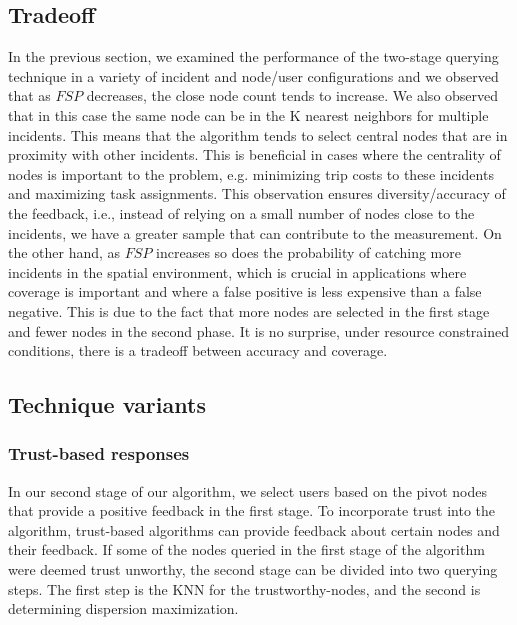 \documentclass{acm_proc_article-sp}
\begin{document}
\subsection{Tradeoff}
In the previous section, we examined the performance of the two-stage querying technique in a variety of incident and node/user configurations and we observed that as $FSP$ decreases, the close node count tends to increase. We also observed that in this case the same node can be in the K nearest neighbors for multiple incidents. This means that the algorithm tends to select central nodes that are in proximity with other incidents. This is beneficial in cases where the centrality of nodes is important to the problem, e.g. minimizing trip costs to these incidents and maximizing task assignments. This observation ensures diversity/accuracy of the feedback, i.e., instead of relying on a small number of nodes close to the incidents, we have a greater sample that can contribute to the measurement.
On the other hand, as $FSP$ increases so does the probability of catching more incidents in the spatial environment, which is crucial in applications where coverage is important and where a false positive is less expensive than a false negative. This is due to the fact that more nodes are selected in the first stage and fewer nodes in the second phase. It is no surprise, under resource constrained conditions, there is a tradeoff between accuracy and coverage.

\subsection{Technique variants}
\subsubsection{Trust-based responses}
In our second stage of our algorithm, we select users based on the pivot nodes that provide a positive feedback in the first stage. To incorporate trust into the algorithm, trust-based algorithms can provide feedback about certain nodes and their feedback. If some of the nodes queried in the first stage of the algorithm were deemed trust unworthy, the second stage can be divided into two querying steps. The first step is the KNN for the trustworthy-nodes, and the second is determining dispersion maximization.
\end{document}
